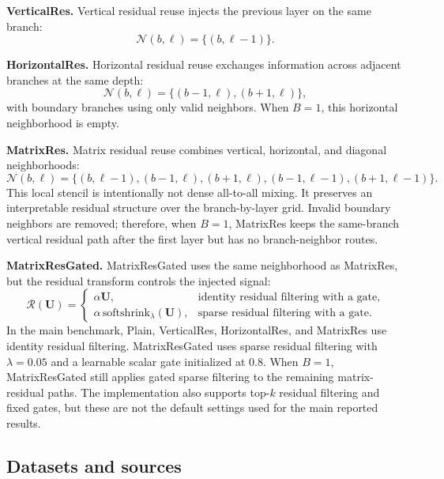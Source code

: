 \textbf{VerticalRes.} Vertical residual reuse injects the previous layer on the same branch:
\begin{equation}
\mathcal{N}(b,\ell)=\{(b,\ell-1)\}.
\end{equation}

\textbf{HorizontalRes.} Horizontal residual reuse exchanges information across adjacent branches at the same depth:
\begin{equation}
\mathcal{N}(b,\ell)=\{(b-1,\ell),(b+1,\ell)\},
\end{equation}
with boundary branches using only valid neighbors. When \(B=1\), this horizontal neighborhood is empty.

\textbf{MatrixRes.} Matrix residual reuse combines vertical, horizontal, and diagonal neighborhoods:
\begin{equation}
\mathcal{N}(b,\ell)=
\{(b,\ell-1),(b-1,\ell),(b+1,\ell),(b-1,\ell-1),(b+1,\ell-1)\}.
\end{equation}
This local stencil is intentionally not dense all-to-all mixing. It preserves an interpretable residual structure over the branch-by-layer grid. Invalid boundary neighbors are removed; therefore, when \(B=1\), MatrixRes keeps the same-branch vertical residual path after the first layer but has no branch-neighbor routes.

\textbf{MatrixResGated.} MatrixResGated uses the same neighborhood as MatrixRes, but the residual transform controls the injected signal:
\begin{equation}
\mathcal{R}(\mathbf{U}) =
\begin{cases}
\alpha \mathbf{U}, & \text{identity residual filtering with a gate},\\
\alpha\,\mathrm{softshrink}_{\lambda}(\mathbf{U}), & \text{sparse residual filtering with a gate}.
\end{cases}
\end{equation}
In the main benchmark, Plain, VerticalRes, HorizontalRes, and MatrixRes use identity residual filtering. MatrixResGated uses sparse residual filtering with \(\lambda=0.05\) and a learnable scalar gate initialized at 0.8. When \(B=1\), MatrixResGated still applies gated sparse filtering to the remaining matrix-residual paths. The implementation also supports top-\(k\) residual filtering and fixed gates, but these are not the default settings used for the main reported results.

\subsection{Datasets and sources}
\label{sec:datasets}

